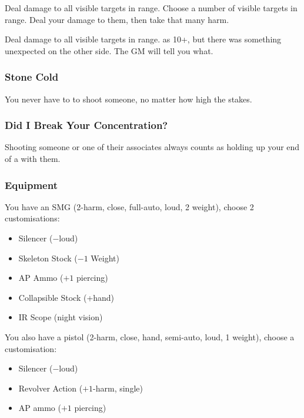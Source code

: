 {Deal damage to all visible targets in range.}
{Choose a number of visible targets in range. Deal your damage to them, then take that many harm.}

{Deal damage to all visible targets in range.}
{as 10+, but there was something unexpected on the other side. The GM will tell you what.}

\subsubsection{Stone Cold} You never have to  to shoot someone, no matter how high the stakes.

\subsubsection{Did I Break Your Concentration?} Shooting someone or one of their associates always counts as holding up your end of a  with them.


\subsubsection{Equipment}
You have an SMG (2-harm, close, full-auto, loud, 2 weight), choose 2 customisations:
\begin{itemize}
\item Silencer ($-$loud)
\item Skeleton Stock ($-1$ Weight)
\item AP Ammo ($+1$ piercing)
\item Collapsible Stock (+hand)
\item IR Scope (night vision)
\end{itemize}

You also have a pistol (2-harm, close, hand, semi-auto, loud, 1 weight), choose a customisation:
\begin{itemize}
\item Silencer ($-$loud)
\item Revolver Action ($+1$-harm, single)
\item AP ammo ($+1$ piercing)
\end{itemize}

